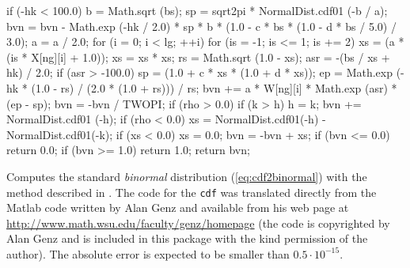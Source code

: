 \begin{code}
\begin{hide}
{{{            if (-hk < 100.0) {
               b = Math.sqrt (bs);
               sp = sqrt2pi * NormalDist.cdf01 (-b / a);
               bvn = bvn - Math.exp (-hk / 2.0) * sp * b * (1.0 - c * bs * (1.0 -
                     d * bs / 5.0) / 3.0);
            }
            a = a / 2.0;
            for (i = 0; i < lg; ++i) {
               for (is = -1; is <= 1; is += 2) {
                  xs = (a * (is * X[ng][i] + 1.0));
                  xs = xs * xs;
                  rs = Math.sqrt (1.0 - xs);
                  asr = -(bs / xs + hk) / 2.0;
                  if (asr > -100.0) {
                     sp = (1.0 + c * xs * (1.0 + d * xs));
                     ep = Math.exp (-hk * (1.0 - rs) / (2.0 * (1.0 + rs))) / rs;
                     bvn += a * W[ng][i] * Math.exp (asr) * (ep - sp);
                  }
               }
            }
            bvn = -bvn / TWOPI;
         }
         if (rho > 0.0) {
            if (k > h)
               h = k;
            bvn += NormalDist.cdf01 (-h);
         }
         if (rho < 0.0) {
            xs = NormalDist.cdf01(-h) - NormalDist.cdf01(-k);
            if (xs < 0.0)
               xs = 0.0;
            bvn = -bvn + xs;
         }
      }
   if (bvn <= 0.0)
      return 0.0;
   if (bvn >= 1.0)
      return 1.0;
   return bvn;

   }\end{hide}
\end{code}
\begin{tabb}
     Computes the standard {\em binormal\/} distribution (\ref{eq:cdf2binormal})
   with the method described in \cite{tGEN04a}. The code for the \texttt{cdf}
  was translated directly from the Matlab code written by Alan Genz
  and available from his web page at
  \url{http://www.math.wsu.edu/faculty/genz/homepage}
   (the code is copyrighted by Alan Genz
  and is included in this package with the kind permission of the author).
   The absolute error is expected to be smaller  than $0.5 \cdot 10^{-15}$.
 \end{tabb}
